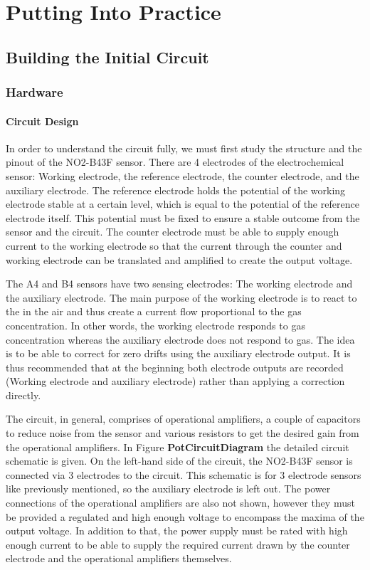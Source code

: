 \chapter{Putting Into Practice}

\section{Building the Initial Circuit}

\subsection{Hardware}
\subsubsection{Circuit Design}
In order to understand the circuit fully, we must first study the structure and the pinout of the NO2-B43F sensor. There are 4 electrodes of the electrochemical sensor: Working electrode, the reference electrode, the counter electrode, and the auxiliary electrode. The reference electrode holds the potential of the working electrode stable at a certain level, which is equal to the potential of the reference electrode itself. This potential must be fixed to ensure a stable outcome from the sensor and the circuit. The counter electrode must be able to supply enough current to the working electrode so that the current through the counter and working electrode can be translated and amplified to create the output voltage.\par
The A4 and B4 sensors have two sensing electrodes: The working electrode and the auxiliary electrode. The main purpose of the working electrode is to react to the  in the air and thus create a current flow proportional to the gas concentration. In other words, the working electrode responds to gas concentration whereas the auxiliary electrode does not respond to gas. The idea is to be able to correct for zero drifts using the auxiliary electrode output. It is thus recommended that at the beginning both electrode outputs are recorded (Working electrode and auxiliary electrode) rather than applying a correction directly.\par
The circuit, in general, comprises of operational amplifiers, a couple of capacitors to reduce noise from the sensor and various resistors to get the desired gain from the operational amplifiers. In Figure \textbf{PotCircuitDiagram} the detailed circuit schematic is given. On the left-hand side of the circuit, the NO2-B43F sensor is connected via 3 electrodes to the circuit. This schematic is for 3 electrode sensors like previously mentioned, so the auxiliary electrode is left out. The power connections of the operational amplifiers are also not shown, however they must be provided a regulated and high enough voltage to encompass the maxima of the output voltage. In addition to that, the power supply must be rated with high enough current to be able to supply the required current drawn by the counter electrode and the operational amplifiers themselves.\par

